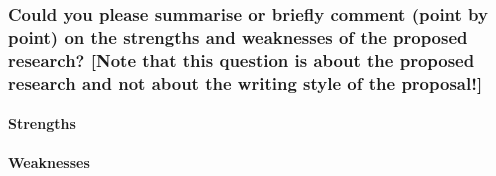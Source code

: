 \subsubsection*{Could you please summarise or briefly comment (point by point) on the strengths and weaknesses of the proposed research? [Note that this question is about the proposed research and not about the writing style of the proposal!]}
\paragraph{Strengths}
\begin{itemize}
\end{itemize}

\paragraph{Weaknesses}
\begin{itemize}
\end{itemize}
